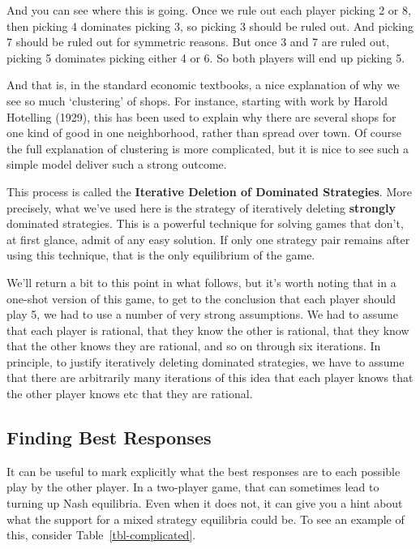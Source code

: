 \documentclass[
  11pt,
  letterpaper,
]{scrbook}
\begin{document}
And you can see where this is going. Once we rule out each player
picking 2 or 8, then picking 4 dominates picking 3, so picking 3 should
be ruled out. And picking 7 should be ruled out for symmetric reasons.
But once 3 and 7 are ruled out, picking 5 dominates picking either 4 or
6. So both players will end up picking 5.

And that is, in the standard economic textbooks, a nice explanation of
why we see so much `clustering' of shops. For instance, starting with
work by Harold Hotelling (1929), this has been used to explain why there
are several shops for one kind of good in one neighborhood, rather than
spread over town. Of course the full explanation of clustering is more
complicated, but it is nice to see such a simple model deliver such a
strong outcome.

This process is called the \textbf{Iterative Deletion of Dominated
Strategies}. More precisely, what we've used here is the strategy of
iteratively deleting \textbf{strongly} dominated strategies. This is a
powerful technique for solving games that don't, at first glance, admit
of any easy solution. If only one strategy pair remains after using this
technique, that is the only equilibrium of the game.

We'll return a bit to this point in what follows, but it's worth noting
that in a one-shot version of this game, to get to the conclusion that
each player should play 5, we had to use a number of very strong
assumptions. We had to assume that each player is rational, that they
know the other is rational, that they know that the other knows they are
rational, and so on through six iterations. In principle, to justify
iteratively deleting dominated strategies, we have to assume that there
are arbitrarily many iterations of this idea that each player knows that
the other player knows etc that they are rational.

\subsection{Finding Best Responses}\label{sec-finding-best-responses}

It can be useful to mark explicitly what the best responses are to each
possible play by the other player. In a two-player game, that can
sometimes lead to turning up Nash equilibria. Even when it does not, it
can give you a hint about what the support for a mixed strategy
equilibria could be. To see an example of this, consider
Table~\ref{tbl-complicated}.
\end{document}
